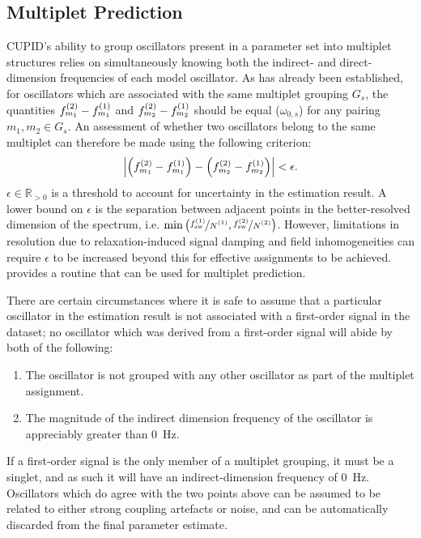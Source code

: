 \subsection{Multiplet Prediction}
\label{subsec:mp-selection}
\ac{CUPID}'s ability to group oscillators present in a parameter set into
multiplet structures relies on simultaneously knowing both the indirect- and
direct-dimension frequencies of each model oscillator. As has already been
established, for oscillators which are associated with the same multiplet
grouping $G_s$, the quantities $f^{(2)}_{m_1} - f^{(1)}_{m_1}$ and $f^{(2)}_{m_2} -
f^{(1)}_{m_2}$ should be equal ($\omega_{0,s}$) for any pairing  $m_1, m_2 \in
G_s$. An assessment of whether two oscillators belong to the same multiplet can
therefore be made using the following criterion:
\begin{equation}
    \left \lvert
        \left( f^{(2)}_{m_1} - f^{(1)}_{m_1} \right) -
        \left( f^{(2)}_{m_2} - f^{(1)}_{m_2} \right)
    \right \rvert < \epsilon.
\end{equation}
$\epsilon \in \mathbb{R}_{>0}$ is a threshold to account for uncertainty in
the estimation result. A lower bound on $\epsilon$ is the separation between
adjacent points in the better-resolved dimension of the spectrum, i.e.
$\min\left(\nicefrac{\fswone}{\None},
\nicefrac{\fswtwo}{\Ntwo}\right)$.  However, limitations in resolution due to
relaxation-induced signal damping and field inhomogeneities can require
$\epsilon$ to be increased beyond this for effective assignments
to be achieved.  provides a \Python routine that
can be used for multiplet prediction.

There are certain circumstances where it is safe to assume that a
particular oscillator in the estimation result is not associated with a
first-order signal in the dataset;
no oscillator which was derived from a first-order signal will abide by both of
the following:
\begin{enumerate}
    \item The oscillator is not grouped with any other oscillator as part of
        the multiplet assignment.
    \item The magnitude of the indirect dimension frequency of the oscillator
        is appreciably greater than \qty{0}{\hertz}.
\end{enumerate}
If a first-order signal is the only
member of a multiplet grouping, it must be a singlet, and as such it will have
an indirect-dimension frequency of \qty{0}{\hertz}. Oscillators which do agree
with the two points above can be assumed to be related to either strong
coupling artefacts or noise, and can be automatically discarded from the final
parameter estimate.
